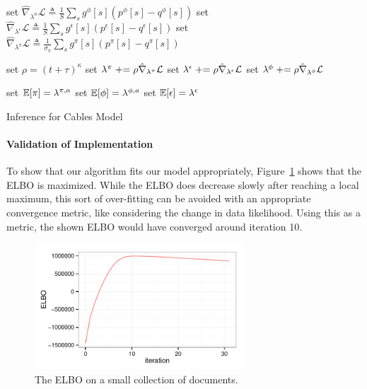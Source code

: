 \begin{algorithm}
{	
	set $\hat\nabla_{\lambda^{\phi} }\mathcal{L} \triangleq \frac{1}{S} \sum_s g^\phi[s] ( p^\phi[s] -  q^\phi[s] )$ \;
	set $\hat\nabla_{\lambda^{\epsilon}} \mathcal{L} \triangleq \frac{1}{S} \sum_s g^\epsilon[s] ( p^\epsilon[s] -  q^\epsilon[s] )$ \;
	set $\hat\nabla_{\lambda^{\pi}} \mathcal{L} \triangleq \frac{1}{\sigma_\pi} \sum_s g^\pi[s] ( p^\pi[s] -  q^\pi[s] )$ \;

	\BlankLine
	set $\rho= (t +\tau)^\kappa$ \;
	set $\lambda^{\pi} \mathrel{+}= \rho \hat\nabla_{\lambda^{\pi}} \mathcal{L}$ \;
	set $\lambda^{\epsilon} \mathrel{+}= \rho \hat\nabla_{\lambda^{\epsilon}} \mathcal{L}$ \;
	set $\lambda^{\phi} \mathrel{+}= \rho \hat\nabla_{\lambda^{\phi}} \mathcal{L}$ \;
}

set $\mathbb{E}[\pi] = \lambda^{\pi,a}$ \;
set $\mathbb{E}[\phi] = \lambda^{\phi,a}$ \;
set $\mathbb{E}[\epsilon] = \lambda^{\epsilon}$ \;
\BlankLine
\Return{$\E[\pi]$, $\E[\phi]$, $\E[\epsilon]$} \;
\caption{Inference for Cables Model}
\label{alg:cables}
\end{algorithm}

\paragraph{Validation of Implementation}
To show that our algorithm fits our model appropriately, Figure~\ref{fig:ELBO} shows that the ELBO is maximized.  While the ELBO does decrease slowly after reaching a local maximum, this sort of over-fitting can be avoided with an appropriate convergence metric, like considering the change in data likelihood. Using this as a metric, the shown ELBO would have converged around iteration 10.
\begin{figure}[ht]
\centering
\includegraphics[width=0.7\textwidth]{fig/ELBO.pdf}
\caption{The ELBO on a small collection of documents.}
\label{fig:ELBO}
\end{figure}



